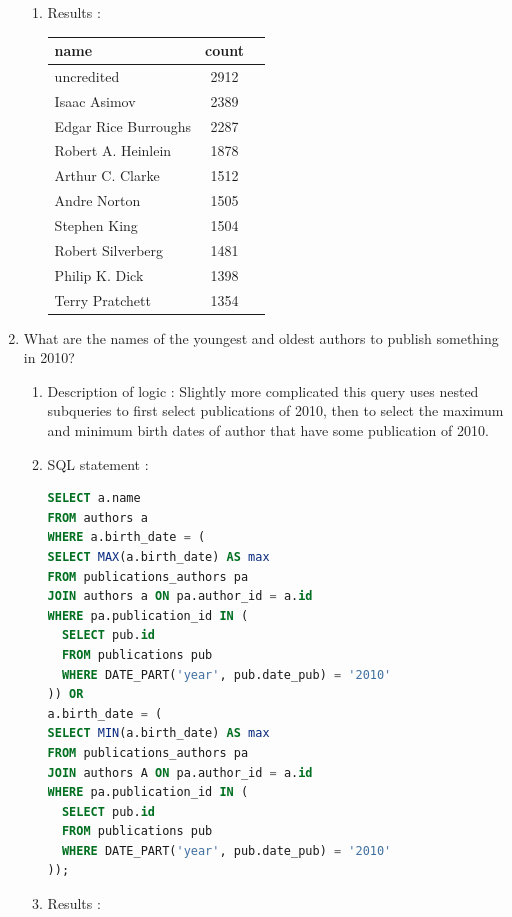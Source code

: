 \documentclass[doubleside, titlepage]{article}
\begin{document}
\begin{enumerate}
\begin{enumerate}
	\item Results :\\

	\begin{tabular}{|l|c|r|}
  \hline
  name & count \\
  \hline
uncredited & 2912\\
Isaac Asimov & 2389\\
Edgar Rice Burroughs & 2287\\
Robert A. Heinlein	& 1878\\
Arthur C. Clarke & 1512\\
Andre Norton & 1505\\
Stephen King & 1504\\
Robert Silverberg & 1481\\
Philip K. Dick & 1398\\
Terry Pratchett	& 1354\\
  \hline
\end{tabular}

	\end{enumerate}
\newpage
\item What are the names of the youngest and oldest authors to publish something in 2010?

			\begin{enumerate}
	\item Description of logic : Slightly more complicated this query uses nested subqueries to first select publications of 2010, then to select the maximum and minimum  birth dates of author that have some publication of 2010.
	\item SQL statement :
		\begin{lstlisting}[language=SQL,showspaces=false,basicstyle=\ttfamily,numberstyle=\tiny,commentstyle=\color{gray}]
SELECT a.name
FROM authors a
WHERE a.birth_date = (
SELECT MAX(a.birth_date) AS max
FROM publications_authors pa
JOIN authors a ON pa.author_id = a.id
WHERE pa.publication_id IN (
  SELECT pub.id
  FROM publications pub
  WHERE DATE_PART('year', pub.date_pub) = '2010'
)) OR
a.birth_date = (
SELECT MIN(a.birth_date) AS max
FROM publications_authors pa
JOIN authors A ON pa.author_id = a.id
WHERE pa.publication_id IN (
  SELECT pub.id
  FROM publications pub
  WHERE DATE_PART('year', pub.date_pub) = '2010'
));
		\end{lstlisting}

	\item Results :\\


\end{enumerate}
\end{enumerate}
\end{document}
